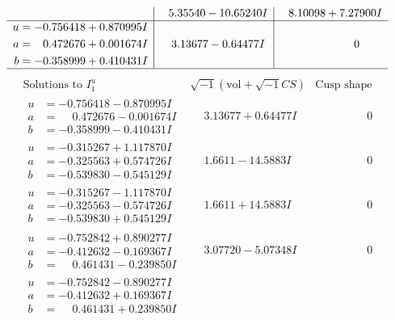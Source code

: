\documentclass[1p]{elsarticle_modified}
\theoremstyle{definition}
\newcommand{\I}{\sqrt{-1}}
\begin{document}
$$\begin{array}{c|c|c}
 & \phantom{-}5.35540 - 10.65240 I & \phantom{-}8.10098 + 7.27900 I \\ \hline\begin{aligned}
u &= -0.756418 + 0.870995 I \\
a &= \phantom{-}0.472676 + 0.001674 I \\
b &= -0.358999 + 0.410431 I\end{aligned}
 & \phantom{-}3.13677 - 0.64477 I & \phantom{-0.000000 } 0\\
 \hline 
 \end{array}$$\newpage$$\begin{array}{c|c|c}  
\text{Solutions to }I^u_{1}& \I (\text{vol} + \sqrt{-1}CS) & \text{Cusp shape}\\
 \hline 
\begin{aligned}
u &= -0.756418 - 0.870995 I \\
a &= \phantom{-}0.472676 - 0.001674 I \\
b &= -0.358999 - 0.410431 I\end{aligned}
 & \phantom{-}3.13677 + 0.64477 I & \phantom{-0.000000 } 0 \\ \hline\begin{aligned}
u &= -0.315267 + 1.117870 I \\
a &= -0.325563 + 0.574726 I \\
b &= -0.539830 - 0.545129 I\end{aligned}
 & \phantom{-}1.6611 - 14.5883 I & \phantom{-0.000000 } 0 \\ \hline\begin{aligned}
u &= -0.315267 - 1.117870 I \\
a &= -0.325563 - 0.574726 I \\
b &= -0.539830 + 0.545129 I\end{aligned}
 & \phantom{-}1.6611 + 14.5883 I & \phantom{-0.000000 } 0 \\ \hline\begin{aligned}
u &= -0.752842 + 0.890277 I \\
a &= -0.412632 - 0.169367 I \\
b &= \phantom{-}0.461431 - 0.239850 I\end{aligned}
 & \phantom{-}3.07720 - 5.07348 I & \phantom{-0.000000 } 0 \\ \hline\begin{aligned}
u &= -0.752842 - 0.890277 I \\
a &= -0.412632 + 0.169367 I \\
b &= \phantom{-}0.461431 + 0.239850 I\end{aligned}

\end{array}$$
\end{document}
